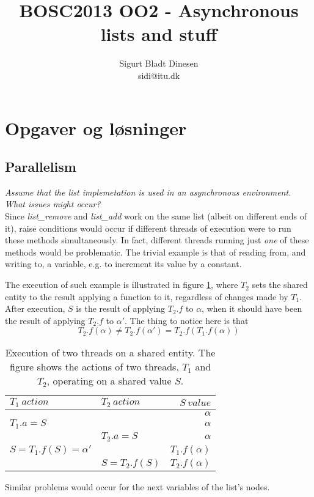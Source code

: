 \documentclass[a4paper, titlepage]{article}
\begin{document}
\title{BOSC2013 OO2 - Asynchronous lists and stuff}
\author{Sigurt Bladt Dinesen \\sidi{@}itu.dk}
\maketitle
\section*{Opgaver og løsninger}
\subsection*{Parallelism}
\textit{Assume that the list implemetation is used in an asynchronous
environment. What issues might occur?}\\

Since \emph{list\_remove} and \emph{list\_add} work on the same list (albeit on
different ends of it), raise conditions would occur if different threads of
execution were to run these methods simultaneously. In fact, different threads
running just \textit{one} of these methods would be problematic. The trivial
example is that of reading from, and writing to, a variable, e.g. to increment
its value by a constant.

The execution of such example is illustrated in figure
\ref{tab:threadaccess}, where $T_2$ sets the shared entity to the result
applying a function to it, regardless of changes made by $T_1$. After
execution, $S$ is the result of applying $T_2.f$ to $\alpha$, when it should
have been the result of applying $T_2.f$ to $\alpha'$. The thing to notice here
is that $$T_2.f(\alpha) \neq T_2.f(\alpha') = T_2.f(T_1.f(\alpha))$$

\begin{table}[hbtp]
	\centering
	\begin{tabular}{|l|l|r|}
		\hline
		$T_1\ action$&$T_2\ action$&$S\ value$\\
		\hline
		&&$\alpha$\\
		\hline
		$T_1.a = S$&&$\alpha$\\
		\hline
		&$T_2.a = S$&$\alpha$\\
		\hline
		$S = T_1.f(S) = \alpha'$&&$T_1.f(\alpha)$\\
		\hline
		&$S = T_2.f(S)$&$T_2.f(\alpha)$\\
		\hline
	\end{tabular}
	\caption{
		Execution of two threads on a shared entity. The figure shows
		the actions of two threads, $T_1$ and $T_2$, operating on a
		shared value $S$.
		\label{tab:threadaccess}
	}
\end{table}


Similar problems would
occur for the next variables of the list's nodes.
\end{document}
